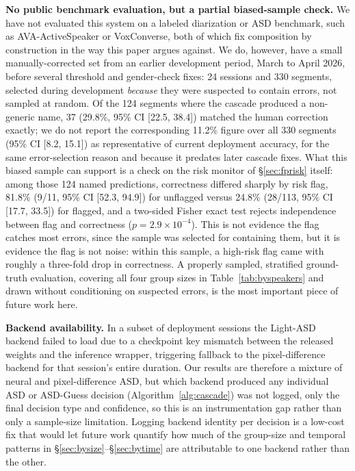 \documentclass[conference,a4paper]{IEEEtran}
\begin{document}
\textbf{No public benchmark evaluation, but a partial biased-sample
check.} We have not evaluated this
system on a labeled diarization or ASD benchmark, such as
AVA-ActiveSpeaker or VoxConverse, both of which fix composition by
construction in the way this paper argues against. We do, however,
have a small manually-corrected set from an earlier development
period, March to April 2026, before several threshold and
gender-check fixes: 24 sessions and 330 segments, selected during
development \emph{because} they were suspected to contain errors, not
sampled at random. Of the 124 segments where the cascade produced a
non-generic name, 37 (29.8\%, 95\% CI [22.5, 38.4]) matched the human
correction exactly; we do not report the corresponding 11.2\% figure
over all 330 segments (95\% CI [8.2, 15.1]) as representative of
current deployment accuracy, for the same error-selection reason and
because it predates later cascade fixes. What this biased sample can
support is a check on the risk monitor of \S\ref{sec:fprisk} itself:
among those 124 named predictions, correctness differed sharply by
risk flag, 81.8\% (9/11, 95\% CI [52.3, 94.9]) for unflagged versus
24.8\% (28/113, 95\% CI [17.7, 33.5]) for flagged, and a two-sided
Fisher exact test rejects independence between flag and correctness
($p=2.9\times10^{-4}$). This is not evidence the flag catches most
errors, since the sample was selected for containing them, but it is
evidence the flag is not noise: within this sample, a high-risk flag
came with roughly a three-fold drop in correctness. A properly
sampled, stratified ground-truth evaluation, covering all four group
sizes in Table~\ref{tab:byspeakers} and drawn without conditioning on
suspected errors, is the most important piece of future work here.

\textbf{Backend availability.} In a subset of deployment sessions the
Light-ASD backend failed to load due to a checkpoint key mismatch
between the released weights and the inference wrapper, triggering
fallback to the pixel-difference backend for that session's entire
duration. Our results are therefore a mixture of neural and
pixel-difference ASD, but which backend produced any individual ASD or
ASD-Guess decision (Algorithm~\ref{alg:cascade}) was not logged, only
the final decision type and confidence, so this is an instrumentation
gap rather than only a sample-size limitation. Logging backend
identity per decision is a low-cost fix that would let future work
quantify how much of the group-size and temporal patterns in
\S\ref{sec:bysize}--\S\ref{sec:bytime} are attributable to one backend
rather than the other.
\end{document}
